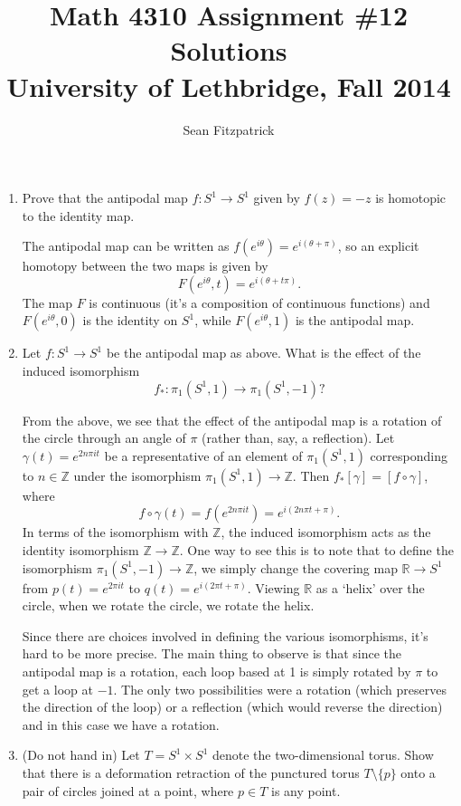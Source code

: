 \documentclass[letterpaper,12pt]{article}
\title{Math 4310 Assignment \#12 Solutions\\University of Lethbridge, Fall 2014}
\author{Sean Fitzpatrick}
\newcommand{\R}{\mathbb{R}}
\newcommand{\Z}{\mathbb{Z}}
\begin{document}
 \maketitle

\begin{enumerate}
\item Prove that the antipodal map $f:S^1\to S^1$ given by $f(z)=-z$ is homotopic to the identity map.

\bigskip

The antipodal map can be written as $f(e^{i\theta}) = e^{i(\theta+\pi)}$, so an explicit homotopy between the two maps is given by
\[
F(e^{i\theta},t) = e^{i(\theta+t\pi)}.
\]
The map $F$ is continuous (it's a composition of continuous functions) and $F(e^{i\theta},0)$ is the identity on $S^1$, while $F(e^{i\theta},1)$ is the antipodal map.

\bigskip

\item Let $f:S^1\to S^1$ be the antipodal map as above. What is the effect of the induced isomorphism
\[
f_*:\pi_1(S^1,1)\to \pi_1(S^1,-1)?
\]

\bigskip

From the above, we see that the effect of the antipodal map is a rotation of the circle through an angle of $\pi$ (rather than, say, a reflection). Let $\gamma(t) = e^{2n\pi i t}$ be a representative of an element of $\pi_1(S^1,1)$ corresponding to $n\in \Z$ under the isomorphism $\pi_1(S^1,1)\to \Z$. Then $f_*[\gamma] = [f\circ \gamma]$, where
\[
f\circ \gamma(t) = f(e^{2n\pi i t}) = e^{i(2n\pi t+\pi)}.
\]
In terms of the isomorphism with $\Z$, the induced isomorphism acts as the identity isomorphism $\Z\to\Z$. One way to see this is to note that to define the isomorphism $\pi_1(S^1,-1)\to\Z$, we simply change the covering map $\R\to S^1$ from $p(t)=e^{2\pi i t}$ to $q(t) = e^{i(2\pi t+\pi)}$. Viewing $\R$ as a `helix'  over the circle, when we rotate the circle, we rotate the helix. 

Since there are choices involved in defining the various isomorphisms, it's hard to be more precise. The main thing to observe is that since the antipodal map is a rotation, each loop based at 1 is simply rotated by $\pi$ to get a loop at $-1$. The only two possibilities were a rotation (which preserves the direction of the loop) or a reflection (which would reverse the direction) and in this case we have a rotation.

\bigskip

\item (Do not hand in) Let $T = S^1\times S^1$ denote the two-dimensional torus. Show that there is a deformation retraction of the punctured torus $T\setminus\{p\}$ onto a pair of circles joined at a point, where $p\in T$ is any point.


\end{enumerate}
\end{document}
